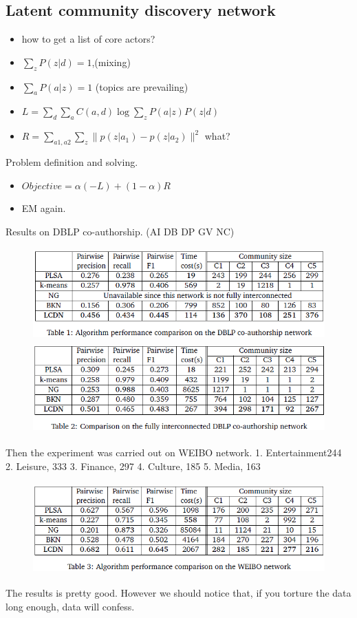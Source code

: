 \documentclass[UTF8, 11pt, a4paper]{ctexart}
\begin{document}
\subsection{Latent community discovery network}
\begin{itemize}
\item how to get a list of core actors?
\item $\sum_z P(z|d)=1$,(mixing) 
\item $\sum_a P(a|z)=1$ (topics are prevailing)
\item $L=\sum_d \sum_a C(a,d) \log \sum_z P(a|z)P(z|d)$
\item $R=\sum_{a1,a2} \sum_z \|p(z|a_1) - p(z|a_2)\|^2$ what?
\end{itemize}
Problem definition and solving.
\begin{itemize}
\item $Objective=\alpha (-L) + (1-\alpha)R$
\item EM again.
\end{itemize}
Results on DBLP co-authorship.
(AI DB DP GV NC)
\begin{figure}[H]
	\centering
\includegraphics[height=3.5cm]{lcdndblp}
\includegraphics[height=3.5cm]{lcdndblpfully}
	\caption{}
\end{figure}
Then the experiment was carried out on WEIBO network.
1. Entertainment244 2. Leisure,  333 
3. Finance,  297 4. Culture,  185
5. Media,  163 
\begin{figure}[H]
	\centering
\includegraphics[height=3.5cm]{lcdnweibo}
	\caption{}
\end{figure}
The results is pretty good. However we should notice that, if you torture the data long enough, data will confess.
\end{document}
